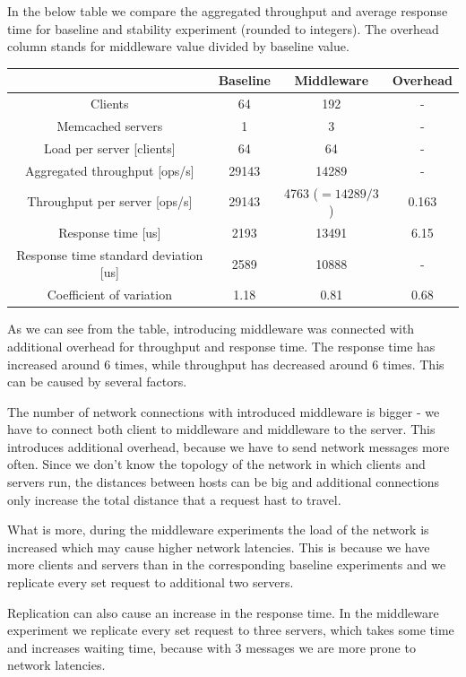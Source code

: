 \documentclass[11pt]{article}
\begin{document}
In the below table we compare the aggregated throughput and average response time for baseline and stability experiment (rounded to integers). The overhead column stands for middleware value divided by baseline value.
\medskip

\begin{tabular}{|c|c|c|c|}
\hline & \textbf{Baseline}& \textbf{Middleware} & \textbf{Overhead} \\ 
\hline Clients & 64 & 192 & - \\
\hline Memcached servers & 1 & 3 & - \\
\hline Load per server [clients] & 64 & 64 & -\\
\hline Aggregated throughput [ops/s] & 29143 & 14289 & - \\ 
\hline Throughput per server [ops/s] & 29143 & 4763 ($= 14289/3$) & 0.163 \\
\hline Response time [us] & 2193 & 13491 & 6.15 \\
\hline Response time standard deviation [us] & 2589 & 10888 & - \\
\hline Coefficient of variation & 1.18 & 0.81 & 0.68 \\
\hline 
\end{tabular}
\medskip

As we can see from the table, introducing middleware was connected with additional overhead for throughput and response time. The response time has increased around 6 times, while throughput has decreased around 6 times. This can be caused by several factors. 

The number of network connections with introduced middleware is bigger - we have to connect both client to middleware and middleware to the server. This introduces additional overhead, because we have to send network messages more often. Since we don't know the topology of the network in which clients and servers run, the distances between hosts can be big and additional connections only increase the total distance that a request hast to travel. 

What is more, during the middleware experiments the load of the network is increased which may cause higher network latencies. This is because we have more clients and servers than in the corresponding baseline experiments and we replicate every set request to additional two servers.

Replication can also cause an increase in the response time. In the middleware experiment we replicate every set request to three servers, which takes some time and increases waiting time, because with 3 messages we are more prone to network latencies.
\end{document}
